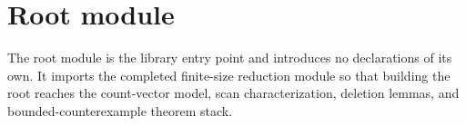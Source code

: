 \chapter{Root module}

The root module is the library entry point and introduces no declarations of
its own.  It imports the completed finite-size reduction module so that
building the root reaches the count-vector model, scan characterization,
deletion lemmas, and bounded-counterexample theorem stack.
